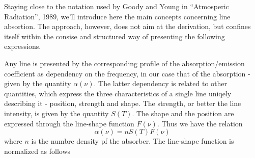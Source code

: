 \def\alphacpc{\alpha^{\mbox{\tiny \rm CP98}}_{\mbox{\tiny c}}} 
%
\def\alphatot{\alpha_{\mbox{\tiny \sf tot}}} 
\def\alphal{\alpha_{\mbox{\tiny $\ell$}}} 
\def\alphac{\alpha_{\mbox{\tiny \sf c}}} 
\def\alphacs{\alpha_{\mbox{\tiny \sf c,s}}} 
\def\alphacf{\alpha_{\mbox{\tiny \sf c,f}}} 
%
\def\gamk{\gamma_{\sf k}}
\def\gamc{\gamma_{\sf c}}
%
\def\ws{w_{\sf s,k}}
\def\xs{x_{\sf s,k}}
\def\wf{w_{\sf f,k}}
\def\xf{x_{\sf f,k}}
%
\def\wn{\bar{\nu}}
\def\nucc{\nu_{\sf c}}
\def\nucut{\nu_{\sf cutoff}}
\def\nuo{\nu_{\mbox{\sf \tiny 0}}}
\def\nuk{\nu_{\sf k}}
%
\def\shape{F(\nu,\nuk)}
\def\shapec{F_{c}(\nu,\nuk)}
\def\shapefp{f_{c}(\nu,+\nuk)}
\def\shapefm{f_{c}(\nu,-\nuk)}
\def\shapefpm{f_{c}(\nu,\pm\nuk)}
\def\inten{S_{\sf k}(T)}
\def\inteno{S_{\sf k}(300\,K)}
%
\def\fcs{\mbox{C}^{\mbox{\tiny \rm fit}}_{\mbox{\tiny \rm s}}} 
\def\fcf{\mbox{C}^{\mbox{\tiny \rm fit}}_{\mbox{\tiny \rm f}}}
\def\fcsf{\mbox{C}^{\mbox{\tiny \rm fit}}_{\mbox{\tiny \rm s,f}}} 
\def\tfcs{\mbox{\tiny C}^{\mbox{\tiny \rm fit}}_{\mbox{\tiny \rm s}}} 
\def\tfcf{\mbox{\tiny C}^{\mbox{\tiny \rm fit}}_{\mbox{\tiny \rm f}}} 
\def\tfcsf{\mbox{C}^{\mbox{\tiny \rm fit}}_{\mbox{\tiny \rm s,f}}} 
\def\tflncsf{\mbox{\tiny ln\,C}^{\mbox{\tiny \rm fit}}_{\mbox{\tiny \rm s,f}}} 
%
\def\cx{C_{\mbox{\tiny \sf x}}}
\def\cs{C_{\mbox{\tiny \sf H}_{2}\mbox{\tiny \sf O}}} 
\def\cf{C_{\mbox{\tiny \sf N}_{2}}} 
\def\cxo{C^{\mbox{\tiny \sf o}}_{\mbox{\tiny \sf X}}} 
\def\cso{C^{\mbox{\tiny \sf o}}_{\mbox{\tiny \sf H}_{2}\mbox{\tiny \sf O}}} 
\def\cfo{C^{\mbox{\tiny \sf o}}_{\mbox{\tiny \sf N}_{2}}} 
\def\cao{C^{\mbox{\tiny \sf o}}_{\mbox{\tiny \sf air}}}
\def\cdo{C^{\mbox{\tiny \sf o}}_{\mbox{\tiny \sf d}}}
\def\xx{{\sf n}_{\mbox{\tiny \sf x}}} 
\def\xs{{\sf n}_{\mbox{\tiny \sf s}}} 
\def\xf{{\sf n}_{\mbox{\tiny \sf f}}} 
\def\xd{{\sf n}_{\mbox{\tiny \sf d}}}
%

\label{sec:line_absorption}

 
Staying close to the notation used by Goody and Young in ``Atmosperic
Radiation'', 1989, we'll introduce here the main concepts concerning
line absortion. The approach, however, does not aim  at the
derivation, but confines itself within the consise and structured way
of presenting the following expressions.

Any line is presented by the corresponding profile of the absorption/emission
coefficient as dependency on the frequency, in our case that of the
absorption - given by the quantity $\alpha(\nu)$. The latter dependency
is related to other quantities, which express the three
characteristics of a single line uniqely describing it - position,
strength and shape. 
The strength, or better the line intensity, is given by the quantity
$S(T)$. The shape and the position are expressed through the
line-shape function $F(\nu)$. Thus we have the relation 
\begin{equation}
  \alpha(\nu)=nS(T)F(\nu)
\label{}
\end{equation} 
where $n$ is the numbre density pf the absorber. The line-shape
function is normalized as follows

